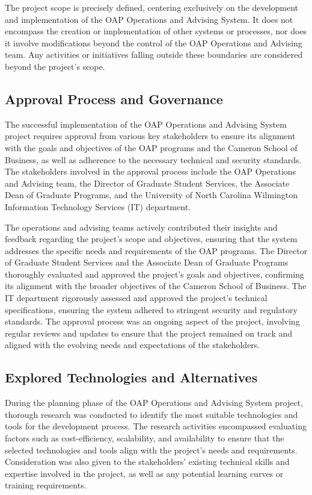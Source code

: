 \documentclass[12pt]{article}
\begin{document}
The project scope is precisely defined, centering exclusively on the development and implementation of the OAP Operations and Advising System. It does not encompass the creation or implementation of other systems or processes, nor does it involve modifications beyond the control of the OAP Operations and Advising team. Any activities or initiatives falling outside these boundaries are considered beyond the project's scope.

\subsection{Approval Process and Governance} 
The successful implementation of the OAP Operations and Advising System project requires approval from various key stakeholders to ensure its alignment with the goals and objectives of the OAP programs and the Cameron School of Business, as well as adherence to the necessary technical and security standards. The stakeholders involved in the approval process include the OAP Operations and Advising team, the Director of Graduate Student Services, the Associate Dean of Graduate Programs, and the University of North Carolina Wilmington Information Technology Services (IT) department.

The operations and advising teams actively contributed their insights and feedback regarding the project's scope and objectives, ensuring that the system addresses the specific needs and requirements of the OAP programs. The Director of Graduate Student Services and the Associate Dean of Graduate Programs thoroughly evaluated and approved the project's goals and objectives, confirming its alignment with the broader objectives of the Cameron School of Business. The IT department rigorously assessed and approved the project's technical specifications, ensuring the system adhered to stringent security and regulatory standards. The approval process was an ongoing aspect of the project, involving regular reviews and updates to ensure that the project remained on track and aligned with the evolving needs and expectations of the stakeholders.

\subsection{Explored Technologies and Alternatives} 
During the planning phase of the OAP Operations and Advising System project, thorough research was conducted to identify the most suitable technologies and tools for the development process. The research activities encompassed evaluating factors such as cost-efficiency, scalability, and availability to ensure that the selected technologies and tools align with the project's needs and requirements. Consideration was also given to the stakeholders' existing technical skills and expertise involved in the project, as well as any potential learning curves or training requirements.
\end{document}
